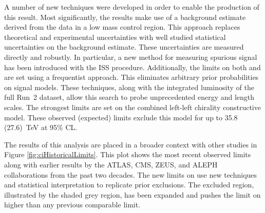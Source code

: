 A number of new techniques were developed in order to enable the production of this result.
Most significantly, the results make use of a background estimate derived from the data in a low mass control region.
This approach replaces theoretical and experimental uncertainties with well studied statistical uncertainties on the background estimate.
These uncertainties are measured directly and robustly.
In particular, a new method for measuring spurious signal has been introduced with the ISS procedure.
Additionally, the limits on both \xsbr and \lam are set using a frequentist approach.
This eliminates arbitrary prior probabilities on signal models.
These techniques, along with the integrated luminosity of the full Run~2 dataset, allow this search to probe unprecedented energy and length scales.
The strongest limits are set on the combined left-left chirality constructive model.
These observed (expected) limits exclude this model for \lam up to 35.8 (27.6)~TeV at 95\% CL.


The results of this analysis are placed in a broader context with other studies in Figure \ref{fig:ciHistoricalLimits}.
This plot shows the most recent observed limits along with earlier results by the ATLAS, CMS, ZEUS, and ALEPH collaborations from the past two decades.
The new limits on \lam use new techniques and statistical interpretation to replicate prior exclusions.
The excluded region, illustrated by the shaded grey region, has been expanded and pushes the limit on \lam higher than any previous comparable limit.




